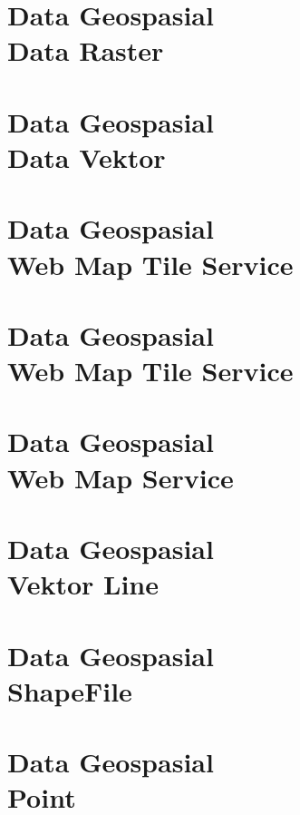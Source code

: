 \documentclass{WileySix}
\begin{document}
\chapter[Data Raster]
{Data Geospasial\\ Data Raster}



\chapter[Data Vektor]
{Data Geospasial\\ Data Vektor}


\chapter[Open Geospatial Consortium]
{Data Geospasial\\ Web Map Tile Service}


\chapter[Web Map Tile Service]
{Data Geospasial\\ Web Map Tile Service}


\chapter[Web Map Service]
{Data Geospasial\\ Web Map Service}


\chapter[Data Vektor Line]
{Data Geospasial\\ Vektor Line}


\chapter[Shapefile]
{Data Geospasial\\ ShapeFile}



\chapter[Shapefile Point]
{Data Geospasial\\ Point}

\end{document}
